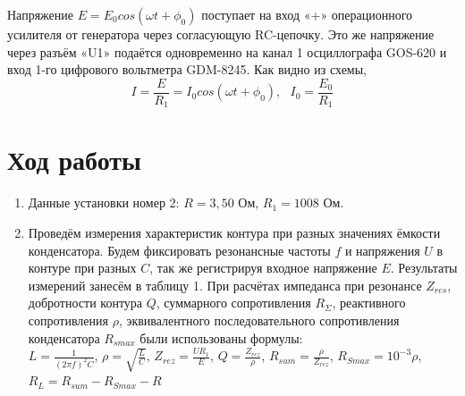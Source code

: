 \documentclass[11pt]{article}
\begin{document}
Напряжение $ E = E_0cos(\omega t + \phi_0) $ поступает на вход «+» операционного усилителя от генератора через согласующую RC-цепочку. Это же напряжение через разъём «U1» подаётся одновременно на канал 1 осциллографа GOS-620 и вход 1-го цифрового вольтметра GDM-8245. Как видно из схемы, \[ I = \frac{E}{R_1} = I_0cos(\omega t + \phi_0), \:\:\: I_0 = \frac{E_0}{R_1} \]


\section{Ход работы}
\begin{enumerate}
\item Данные установки номер 2: $R = 3,50$ Ом, $R_1 = 1008$ Ом.
    \item Проведём измерения характеристик контура при разных значениях ёмкости конденсатора. Будем фиксировать резонансные частоты $f$ и напряжения $U$ в контуре при разных $C$, так же регистрируя входное напряжение $E$. Результаты измерений занесём в таблицу 1. При расчётах импеданса при резонансе $Z_{res}$, добротности контура $Q$, суммарного сопротивления $R_{\Sigma}$, реактивного сопротивления $\rho$, эквивалентного последовательного сопротивления конденсатора $R_{smax}$ были использованы формулы:\\
    $L = \frac{1}{(2\pi f)^2 C}$, $\rho = \sqrt{\frac{L}{C}}$, $Z_{rez} = \frac{UR_1}{E}$, $Q = \frac{Z_{rez}}{\rho}$, $ R_{sum} = \frac{\rho}{Z_{rez}}$, $ R_{Smax} = 10^{-3}\rho$, $R_{L} = R_{sum} - R_{Smax} - R$\\
    

\end{enumerate}
\end{document}
